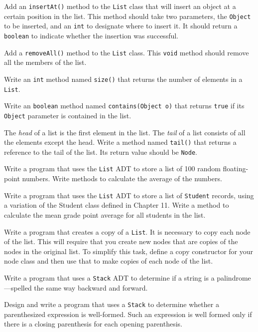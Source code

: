 \begin{EXRtwo}
\item  Add an {\tt insertAt()} method to the {\tt List} class that
will insert an object at a certain position in the list.  This method
should take two parameters, the {\tt Object} to be inserted, and an
{\tt int} to designate where to insert it.   It should return a
{\tt boolean} to indicate whether the insertion was successful.


\item  Add a {\tt removeAll()} method to the {\tt List} class.
This {\tt void} method should remove all the members of the list.

\item  Write an {\tt int}  method named {\tt size()} that returns the
number of elements in a {\tt List}.

\item  Write an {\tt boolean}  method named {\tt contains(Object o)} 
that returns
{\tt true} if its {\tt Object} parameter is contained in the list.

\item  The {\it head} of a list is the first element in the list.
The {\it tail} of a list consists of all the elements except the
head.  Write a method named {\tt tail()} that returns a reference to
the tail of the list.  Its return value should be {\tt Node}.

\item  Write a program that uses the {\tt List} ADT
to store a list of 100 random floating-point numbers.   Write methods
to calculate the average of the numbers.

\item  Write a program that uses the {\tt List} ADT
to store a list of {\tt Student} records, using a variation of the Student
class defined in Chapter 11.  Write a method to calculate the mean
grade point average for all students in the list.

\item  Write a program that creates a copy of a {\tt List}.
It is necessary to copy each node of the list.  This will require that
you create new nodes that are copies of the nodes in the original
list.  To simplify this task, define a copy constructor for your node
class and then use that to make copies of each node of the list.

\item  Write a program that uses a {\tt Stack} ADT to determine
if a string is a palindrome---spelled the same way backward and
forward.

\item  Design and write a program that uses a {\tt Stack} to determine
whether a parenthesized expression is well-formed.  Such an expression
is well formed only if there is a closing parenthesis for each opening
parenthesis.


\end{EXRtwo}
